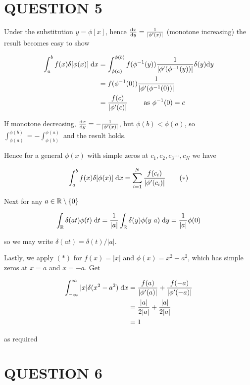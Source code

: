 \documentclass[a4paper]{article}
\begin{document}
\section{QUESTION 5}

Under the substitution $ y = \phi[x] $, hence $ \frac{\mathrm{d} x}{\mathrm{d} y} =  \frac{1}{| \phi'(x) |} $ (monotone increasing) the result becomes easy to show

\begin{align*}
\int_{a}^{b} f(x) \delta[\phi(x)]  \; \mathrm{d} x & = \int_{\phi(a)}^{\phi(b)} f(\phi^{-1}(y)) \frac{1}{| \phi'(\phi^{-1}(y)) |} \delta(y) \mathrm{d} y \\
& = f(\phi^{-1}(0)) \frac{1}{| \phi'(\phi^{-1}(0)) |} \\
& = \frac{f(c)}{| \phi'(c) |} \qquad \text{ as } \phi^{-1}(0) = c
\end{align*}

If monotone decreasing, $ \frac{\mathrm{d} x}{\mathrm{d} y} =  - \frac{1}{| \phi'(x) |} $, but $ \phi(b) < \phi(a) $, so $ \int_{\phi(a)}^{\phi(b)} = - \int_{\phi(b)}^{\phi(a)} $ and the result holds.

Hence for a general $ \phi(x) $ with simple zeros at $ c_{1},c_{2},c_{3}\cdots,c_{N} $ we have

\[ \int_{a}^{b} f(x) \delta[\phi(x)]  \; \mathrm{d} x = \sum_{i=1}^{N}  \frac{f(c_{i})}{| \phi'(c_{i}) |} \qquad (*) \]

Next for any $ a \in \mathbb{R} \setminus \{0 \} $

\[ \int_{\mathbb{R}} \delta(at) \phi(t) \; \mathrm{d} t = \frac{1}{| a |} \int_{\mathbb{R}}  \delta(y) \phi (y \ a) \; \mathrm{d} y = \frac{1}{| a |} \phi(0) \]

so we may write $ \delta(at) = \delta(t) / | a | $.

Lastly, we apply $ (*) $ for $ f(x) = | x | $ and $ \phi(x) = x^{2} - a^{2} $, which has simple zeros at $ x = a $ and $ x = -a $. Get


\begin{align*}
\int_{-\infty}^{\infty} | x | \delta( x^{2} - a^{2} ) \; \mathrm{d} x & = \frac{f(a)}{| \phi'(a) |} + \frac{f(-a)}{| \phi'(-a) |} \\
& = \frac{| a |}{2|  a |} + \frac{| a |}{2| a |} \\
& = 1
\end{align*}

as required





\section{QUESTION 6}
\end{document}
